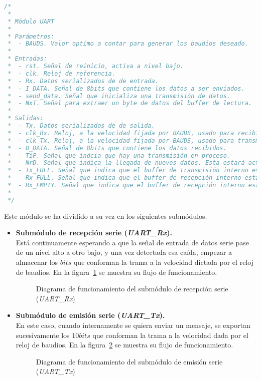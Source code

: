 \begin{lstlisting}[language=Verilog,
    caption={Parámetros, entradas y salidas del módulo UART.},
    label=src:resultados-modulos-uart]
/*
 *
 * Módulo UART
 *
 * Parámetros:
 *  - BAUDS. Valor optimo a contar para generar los baudios deseado.
 *
 * Entradas:
 *  - rst. Señal de reinicio, activa a nivel bajo.
 *  - clk. Reloj de referencia.
 *  - Rx. Datos serializados de de entrada.
 *  - I_DATA. Señal de 8bits que contiene los datos a ser enviados.
 *  - send_data. Señal que inicializa una transmisión de datos.
 *  - NxT. Señal para extraer un byte de datos del buffer de lectura.
 *
 * Salidas:
 *  - Tx. Datos serializados de de salida.
 *  - clk_Rx. Reloj, a la velocidad fijada por BAUDS, usado para recibir los datos.
 *  - clk_Tx. Reloj, a la velocidad fijada por BAUDS, usado para transmitir los datos.
 *  - O_DATA. Señal de 8bits que contiene los datos recibidos.
 *  - TiP. Señal que indcia que hay una transmisión en proceso.
 *  - NrD. Señal que indica la llegada de nuevos datos. Esta estará activa un pulso de clk.
 *  - Tx_FULL. Señal que indica que el buffer de transmisión interno está lleno.
 *  - Rx_FULL. Señal que indica que el buffer de recepción interno está lleno.
 *  - Rx_EMPTY. Señal que indica que el buffer de recepción interno está vacío.
 *
 */
\end{lstlisting}

Este módulo se ha dividido a su vez en los siguientes submódulos.
\begin{itemize}
    \item \textbf{Submódulo de recepción serie (\emph{UART\_Rx}).} \\
    Está continuamente esperando a que la señal de entrada de datos serie pase de un nivel alto a otro bajo, y una vez detectada esa caída, empezar a almacenar los $bits$ que conforman la trama a la velocidad dictada por el reloj de baudios. En la figura~\ref{fig:flujo_uart_rx} se muestra su flujo de funcionamiento.

    \begin{figure}[!hbt]
        \centering
        \scalebox{0.85} {}
        \caption{Diagrama de funcionamiento del submódulo de recepción serie (\emph{UART\_Rx})}
        \label{fig:flujo_uart_rx}
    \end{figure}
    
    \item \textbf{Submódulo de emisión serie (\emph{UART\_Tx}).} \\
    En este caso, cuando internamente se quiera enviar un mensaje, se exportan sucesivamente los $10bits$ que conforman la trama a la velocidad dada por el reloj de baudios. En la figura~\ref{fig:flujo_uart_tx} se muestra su flujo de funcionamiento.
    \begin{figure}[!hbt]
        \centering
        \scalebox{0.85} {}
        \caption{Diagrama de funcionamiento del submódulo de emisión serie (\emph{UART\_Tx})}
        \label{fig:flujo_uart_tx}
    \end{figure}
\end{itemize}


